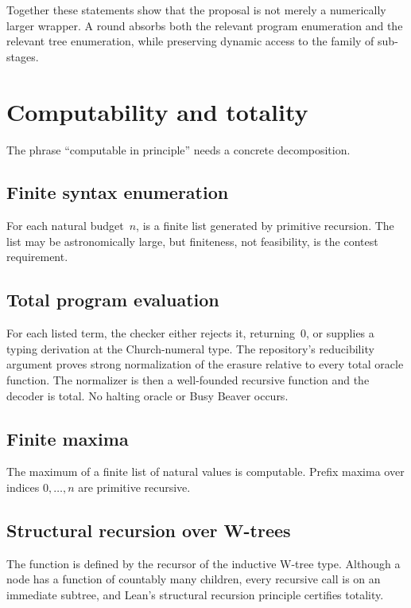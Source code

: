 \documentclass[11pt]{article}
\theoremstyle{definition}
\theoremstyle{remark}
\newcommand{\lean}[1]{\texttt{\detokenize{#1}}}
\begin{document}
Together these statements show that the proposal is not merely a numerically
larger wrapper. A round absorbs both the relevant program enumeration and the
relevant tree enumeration, while preserving dynamic access to the family of
sub-stages.

\section{Computability and totality}

The phrase ``computable in principle'' needs a concrete decomposition.

\subsection{Finite syntax enumeration}

For each natural budget~$n$, \lean{Fk.ctmsUpTo n} is a finite list generated by
primitive recursion. The list may be astronomically large, but finiteness, not
feasibility, is the contest requirement.

\subsection{Total program evaluation}

For each listed term, the checker either rejects it, returning~$0$, or supplies
a typing derivation at the Church-numeral type. The repository's reducibility
argument proves strong normalization of the erasure relative to every total
oracle function. The normalizer is then a well-founded recursive function and
the decoder is total. No halting oracle or Busy Beaver occurs.

\subsection{Finite maxima}

The maximum of a finite list of natural values is computable. Prefix maxima over
indices $0,\ldots,n$ are primitive recursive.

\subsection{Structural recursion over W-trees}

The function \lean{stage11} is defined by the recursor of the inductive W-tree
type. Although a node has a function of countably many children, every recursive
call is on an immediate subtree, and Lean's structural recursion principle
certifies totality.
\end{document}

